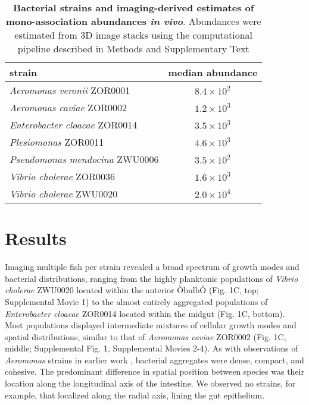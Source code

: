 \begin{table}
\centering
\begin{tabular}{l c }
\midrule
 strain               & median abundance     \\
\midrule
\textit{Aeromonas veronii} ZOR0001 &    $8.4 \times 10^2$                \\
\textit{Aeromonas caviae} ZOR0002 &   $1.2 \times 10^3$                  \\
\textit{Enterobacter cloacae} ZOR0014   &   $ 3.5 \times 10^3$            \\
\textit{Plesiomonas} ZOR0011      &  $ 4.6 \times 10^3 $      \\
\textit{Pseudomonas mendocina} ZWU0006         &   $3.5 \times 10^2$               \\
\textit{Vibrio cholerae} ZOR0036       &    $1.6 \times 10^3$                 \\
\textit{Vibrio cholerae} ZWU0020       &    $2.0 \times 10^4$                 \\
\midrule        
\end{tabular}\caption{\textbf{Bacterial strains and imaging-derived estimates of mono-association abundances \textit{in vivo}}.  Abundances were estimated from 3D image stacks using the computational pipeline described in Methods and Supplementary Text}
\end{table}



 \section{Results}


Imaging multiple fish per strain revealed a broad spectrum of growth modes and bacterial distributions, ranging from the highly planktonic populations of \textit{Vibrio cholerae} ZWU0020 located within the anterior ÒbulbÓ (Fig. 1C, top; Supplemental Movie 1) to the almost entirely aggregated populations of \textit{Enterobacter cloacae} ZOR0014 located within the midgut (Fig. 1C, bottom). Most populations displayed intermediate mixtures of cellular growth modes and spatial distributions, similar to that of \textit{Aeromonas caviae} ZOR0002 (Fig. 1C, middle; Supplemental Fig. 1, Supplemental Movies 2-4). As with observations of \textit{Aeromonas} strains in earlier work \cite{Wiles2016}, bacterial aggregates were dense, compact, and cohesive. The predominant difference in spatial position between species was their location along the longitudinal axis of the intestine. We observed no strains, for example, that localized along the radial axis, lining the gut epithelium.	

